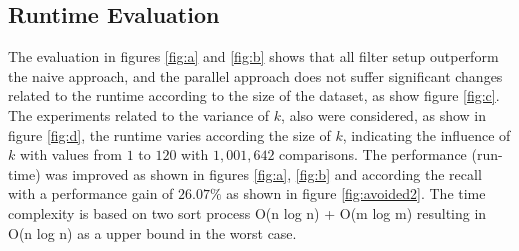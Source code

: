 \subsection{Runtime Evaluation}

The evaluation in figures \ref{fig:a} and \ref{fig:b} shows that all filter setup outperform the naive approach, and the parallel approach does not suffer significant changes related to the runtime according to the size of the dataset, as show figure \ref{fig:c}.
The experiments related to the variance of $k$, also were considered, as show in figure \ref{fig:d}, the runtime varies according the size of $k$, indicating the influence of $k$ with values from $1$ to $120$ with $1,001,642$ comparisons.
The performance (run-time) was improved as shown in figures  \ref{fig:a}, \ref{fig:b} and according the recall with a performance gain of $26.07 \%$ as shown in figure \ref{fig:avoided2}. The time complexity is based on two sort process O(n log n) + O(m log m) resulting in O(n log n) as a upper bound in the worst case.

